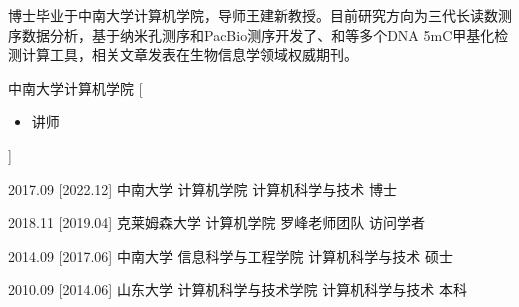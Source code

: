 \documentclass[zh]{resume}
\begin{document}
\makeheader

{\onehalfspacing\hspace{2em}%
博士毕业于中南大学计算机学院，导师王建新教授。目前研究方向为三代长读数测序数据分析，基于纳米孔测序和PacBio测序开发了、和等多个DNA 5mC甲基化检测计算工具，相关文章发表在生物信息学领域权威期刊。
\par}

\begin{competences}
\end{competences}

\begin{experiences}
    {中南大学计算机学院}%
    [\begin{itemize}
      \item 讲师
    \end{itemize}]

  \separator{0.5ex}
\end{experiences}

\begin{educations}
  \education%
    {2017.09}%
    [2022.12]%
    {中南大学}%
    {计算机学院}%
    {计算机科学与技术}%
    {博士}

  \separator{0.5ex}
  \education%
    {2018.11}%
    [2019.04]%
    {克莱姆森大学}%
    {计算机学院}%
    {罗峰老师团队}%
    {访问学者}

  \separator{0.5ex}
  \education%
    {2014.09}%
    [2017.06]%
    {中南大学}%
    {信息科学与工程学院}%
    {计算机科学与技术}%
    {硕士}

  \separator{0.5ex}
  \education%
    {2010.09}%
    [2014.06]%
    {山东大学}%
    {计算机科学与技术学院}%
    {计算机科学与技术}%
    {本科}
\end{educations}
\end{document}
